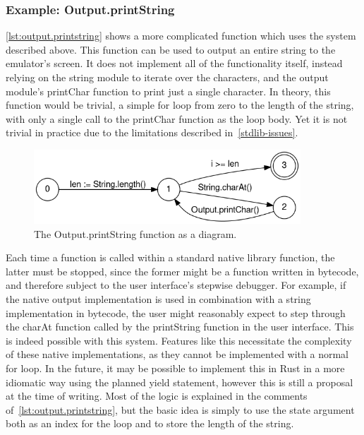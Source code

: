 \subsubsection{Example: Output.printString} \label{complex-example}
\cref{lst:output.printstring} shows a more complicated function which uses the system described above.
This function can be used to output an entire string to the emulator's screen.
It does not implement all of the functionality itself, instead relying on the string module to iterate over the characters, and the output module's printChar function to print just a single character.
In theory, this function would be trivial, a simple for loop from zero to the length of the string, with only a single call to the printChar function as the loop body.
Yet it is not trivial in practice due to the limitations described in~\cref{stdlib-issues}.
\begin{center}
  \begin{figure}[ht]
    \centering
    \includegraphics[width=10cm]{fig/printString.png}
    \caption{The Output.printString function as a diagram.}
    \label{fig:printstring-dfa}
  \end{figure}
\end{center}
Each time a function is called within a standard native library function, the latter must be stopped, since the former might be a function written in bytecode, and therefore subject to the user interface's stepwise debugger.
For example, if the native output implementation is used in combination with a string implementation in bytecode, the user might reasonably expect to step through the charAt function called by the printString function in the user interface.
This is indeed possible with this system.
Features like this necessitate the complexity of these native implementations, as they cannot be implemented with a normal for loop.
In the future, it may be possible to implement this in Rust in a more idiomatic way using the planned yield statement, however this is still a proposal at the time of writing.
Most of the logic is explained in the comments of~\cref{lst:output.printstring}, but the basic idea is simply to use the state argument both as an index for the loop and to store the length of the string.
